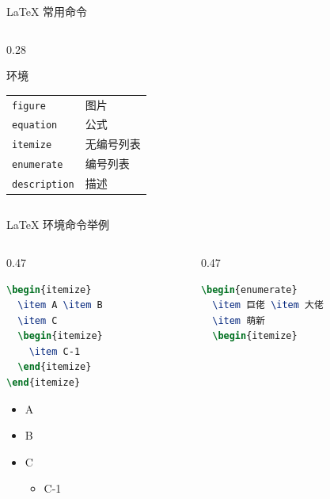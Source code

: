 \documentclass[aspectratio=169]{beamer}
\def\env#1{\texttt{\color{blue}\footnotesize #1}}
\begin{document}
\begin{frame}[fragile]{\LaTeX{} 常用命令}
\begin{columns}[T,onlytextwidth]
\begin{column}{0.28\textwidth}
\begin{exampleblock}{环境}
\begin{tabular}{@{}ll@{}}
            \env{figure} & 图片 \\
            \env{equation} & 公式 \\\hline
            \env{itemize} & 无编号列表 \\
            \env{enumerate} & 编号列表 \\
            \env{description} & 描述 \\\hline
        \end{tabular}
    \end{exampleblock}
    \end{column}
    \end{columns}
\end{frame}

\begin{frame}[fragile]{\LaTeX{} 环境命令举例}
    \begin{columns}[T,onlytextwidth]
    \begin{column}{0.47\textwidth}
\begin{lstlisting}[language=TeX,basicstyle=\ttfamily\footnotesize]
\begin{itemize}
  \item A \item B
  \item C
  \begin{itemize}
    \item C-1
  \end{itemize}
\end{itemize}
\end{lstlisting}
        \medskip
        \begin{itemize}
            \item A
            \item B
            \item C
            \begin{itemize}
                \item C-1
            \end{itemize}
        \end{itemize}
    \end{column}
    \pause
    \begin{column}{0.47\textwidth}
\begin{lstlisting}[language=TeX,basicstyle=\ttfamily\footnotesize]
\begin{enumerate}
  \item 巨佬 \item 大佬
  \item 萌新
  \begin{itemize}

\end{lstlisting}
\end{column}
\end{columns}
\end{frame}
\end{document}
